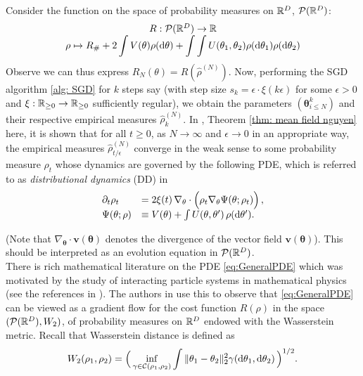 \documentclass{article}
\begin{document}
Consider the function on the space of probability measures on $ \mathbb{R}^{D}$, $  \mathcal{P}(\mathbb{R}^{D})$:
\[
\begin{array}{cc}
    R: \mathcal{P}(\mathbb{R}^{D})\to \mathbb{R} \\ 
    \rho \mapsto R_{\#}+ 2 \displaystyle\int V( \mathbf{\theta}) \rho( \operatorname{d}\! \mathbf{\theta}) + \displaystyle \int\int U( \mathbf{\theta}_{1}, \mathbf{\theta}_{2}) \rho( \operatorname{d}\! \mathbf{\theta}_{1}) \rho( \operatorname{d}\! \mathbf{\theta}_{2})   
\end{array}
\]
Observe we can thus express $ R_{N}(\mathbb{\theta}) = R(\hat{\rho}^{(N)})$. Now, performing the SGD algorithm \ref{alg: SGD} for $ k$ steps say (with step size $ s_k = \epsilon\cdot \xi(k \epsilon)$ for some $ \epsilon >0$ and $ \xi: \mathbb{R}_{\geq 0}\to \mathbb{R}_{\geq 0}$ sufficiently regular), we obtain the parameters $  (\mathbf{\theta}^{k}_{i\leq N})$ and their respective empirical measures $ \hat{\rho}^{(N)}_k$. In \cite{Mei_2018}, Theorem \ref{thm: mean field nguyen} here, it is shown that for all $ t\geq 0$, as $ N\to \infty$ and $ \epsilon \to 0$ in an appropriate way, the empirical measures $ \hat{\rho}^{(N)}_{t/\epsilon}$ converge in the weak sense to some probability measure $ \rho_t$ whose dynamics are governed by the following PDE, which is referred to as \emph{distributional dynamics} (DD) in \cite{Mei_2018}
\begin{equation}
	\begin{array}{ll}
\partial_t \rho_t & =2\xi(t)\, \nabla_{ \mathbf{\theta}}\cdot \Big(\rho_t \nabla_{ \mathbf{\theta}}\Psi( \mathbf{\theta};\rho_t)\Big)\, ,\label{eq:GeneralPDE}\\
\Psi( \mathbf{\theta};\rho) & \equiv V( \mathbf{ \theta})+\int U( \mathbf{\theta}, \mathbf{\theta}')\, \rho(\operatorname{d}\!  \mathbf{\theta}') .
\end{array}
\end{equation}

(Note that $\nabla_{ \mathbf{\theta}}\cdot \mathbf{v}( \mathbf{\theta})$ denotes the divergence of the vector field $ \mathbf{v}( \mathbf{\theta})$). This should  be interpreted as an evolution equation in $ \mathcal{P}(\mathbb{R}^D)$.\\

There is rich mathematical literature on the PDE \eqref{eq:GeneralPDE} which was
motivated by the study of interacting particle systems in mathematical physics (see the references in \cite{Mei_2018}). The authors in \cite{Mei_2018} use this to observe that \eqref{eq:GeneralPDE} can be viewed as a gradient flow for the cost function $R(\rho)$ in the space 
$( \mathcal{P}(\mathbb{R}^D),W_2)$, of probability measures on $\mathbb{R}^D$
endowed with the Wasserstein metric. Recall that Wasserstein distance is defined as
\begin{equation}\label{eq:Wasserstein_dual}
W_2(\rho_1,\rho_2)  = \Big(\inf_{\gamma\in \mathcal{C}(\rho_1,\rho_2)}  \int \| \mathbf{\theta}_1- \mathbf{\theta}_2 \|_2^2 \gamma( \operatorname{d}\!  \mathbf{\theta}_1, \operatorname{d}\! \mathbf{\theta}_2) \,\Big)^{1/2}. 
\end{equation}
\end{document}
